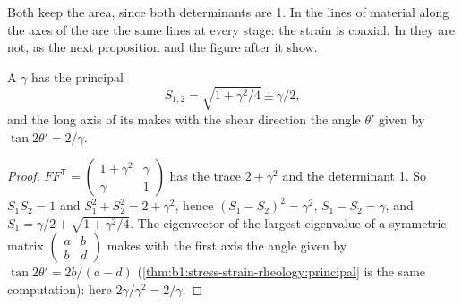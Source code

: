 Both keep the area, since both determinants are 1. In  the lines of
material along the axes of the  are the same lines at every
stage: the strain is coaxial. In  they are not, as the next
proposition and the figure after it show.

\begin{proposition}\label{prop:b1:stress-strain-rheology:simple-shear}
A  $\gamma$ has the principal 
\[
  S_{1,2} = \sqrt{1 + \gamma^2/4} \pm \gamma/2 ,
\]
and the long axis of its  makes with the shear direction the
angle $\theta'$ given by $\tan2\theta' = 2/\gamma$.
\end{proposition}

\begin{proof}
$FF^{\mathsf T} = \begin{pmatrix} 1+\gamma^2 & \gamma \\ \gamma & 1\end{pmatrix}$
has the trace $2+\gamma^2$ and the determinant 1. So $S_1S_2 = 1$ and
$S_1^2 + S_2^2 = 2 + \gamma^2$, hence $(S_1 - S_2)^2 = \gamma^2$,
$S_1 - S_2 = \gamma$, and $S_1 = \gamma/2 + \sqrt{1+\gamma^2/4}$. The
eigenvector of the largest eigenvalue of a symmetric matrix
$\begin{pmatrix} a & b \\ b & d\end{pmatrix}$ makes with the first axis the
angle given by $\tan2\theta' = 2b/(a-d)$ (\cref{thm:b1:stress-strain-rheology:principal}
is the same computation): here $2\gamma/\gamma^2 = 2/\gamma$.
\end{proof}

